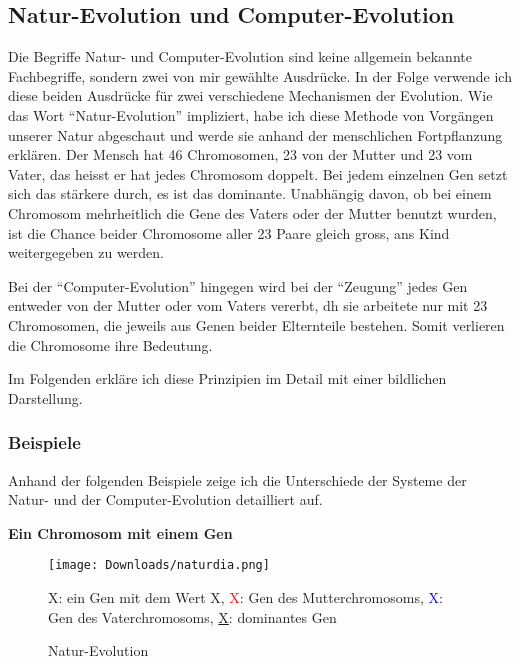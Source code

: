 \documentclass[10pt,a4paper,ngerman,english]{article}
\begin{document}
\subsection{Natur-Evolution und Computer-Evolution}
Die Begriffe Natur- und Computer-Evolution sind keine allgemein bekannte Fachbegriffe, sondern zwei von mir gewählte Ausdrücke. In der Folge verwende ich diese beiden Ausdrücke für zwei verschiedene Mechanismen der Evolution. Wie das Wort \enquote{Natur-Evolution} impliziert, habe ich diese Methode von Vorgängen unserer Natur abgeschaut und werde sie anhand der menschlichen Fortpflanzung erklären. Der Mensch hat 46 Chromosomen, 23 von der Mutter und 23 vom Vater, das heisst er hat jedes Chromosom doppelt. Bei jedem einzelnen Gen setzt sich das stärkere durch, es ist das dominante. Unabhängig davon, ob bei einem Chromosom mehrheitlich die Gene des Vaters oder der Mutter benutzt wurden, ist die Chance beider Chromosome aller 23 Paare gleich gross, ans Kind weitergegeben zu werden. 

Bei der \enquote{Computer-Evolution} hingegen wird bei der \enquote{Zeugung} jedes Gen entweder von der Mutter oder vom Vaters vererbt, dh sie arbeitete nur mit 23 Chromosomen, die jeweils aus Genen beider Elternteile bestehen. Somit verlieren die Chromosome ihre Bedeutung. 


Im Folgenden erkläre ich diese Prinzipien im Detail mit einer bildlichen Darstellung.

\pagebreak

\subsubsection{Beispiele}

Anhand der folgenden Beispiele zeige ich die Unterschiede der Systeme der Natur- und der Computer-Evolution detailliert auf.

\textbf{Ein Chromosom mit einem Gen}

\bigskip

\begin{figure}[h]
    \centering
    \texttt{[image: Downloads/naturdia.png]}
    \caption{Natur-Evolution}
    \medskip
    \scriptsize
    X: ein Gen mit dem Wert X, \textcolor{red}{X}: Gen des Mutterchromosoms, \textcolor{blue}{X}: Gen des Vaterchromosoms, \underline{X}: dominantes Gen
\end{figure}
\end{document}
